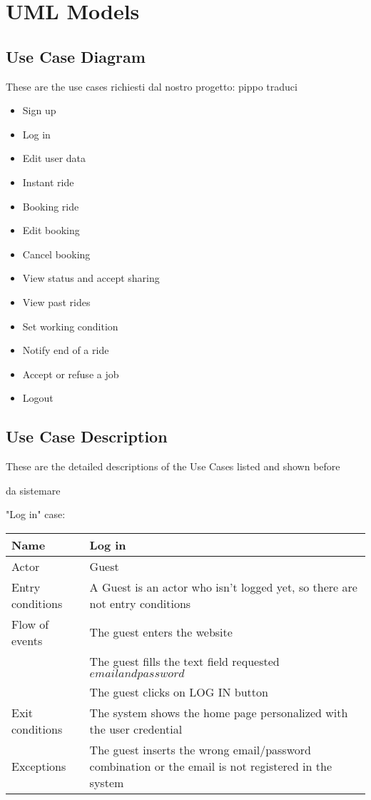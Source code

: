 \section{UML Models}

\subsection{Use Case Diagram}
These are the use cases richiesti dal nostro progetto: \Huge {pippo traduci} \normalsize
\begin{itemize}
	\item Sign up
	\item Log in
	\item Edit user data
	\item Instant ride
	\item Booking ride
	\item Edit booking
	\item Cancel booking
	\item View status and accept sharing
	\item View past rides
	\item Set working condition
	\item Notify end of a ride
	\item Accept or refuse a job
	\item Logout
	
	
	
\end{itemize}
\subsection{Use Case Description}
These are the detailed descriptions of the Use Cases listed and shown before
\begin{Huge} da sistemare 
\end{Huge}

"Log in" case:

\begin{tabular}{|l|l|} 
\hline
Name & Log in\\
\hline
Actor & Guest\\
\hline
Entry conditions & A Guest is an actor who isn't logged yet, so there are not entry conditions\\
\hline
Flow of events
			&	\tabitem The guest enters the website\\
			&	\tabitem The guest fills the text field requested \(email and password\)\\
			&	\tabitem The guest clicks on LOG IN button\\
\hline
Exit conditions & The system shows the home page personalized with the user credential\\
\hline
Exceptions & The guest inserts the wrong email/password combination or the email is not registered in the system\\
\hline
\end {tabular}

